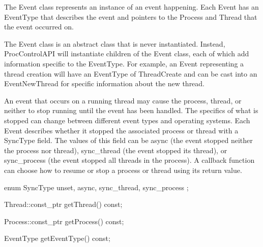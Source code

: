 
The Event class represents an instance of an event happening. Each Event
has an EventType that describes the event and pointers to the Process and
Thread that the event occurred on.

The Event class is an abstract class that is never instantiated. Instead,
ProcControlAPI will instantiate children of the Event class, each of which add
information specific to the EventType. For example, an Event representing a
thread creation will have an EventType of ThreadCreate and can be cast into an
EventNewThread for specific information about the new thread.

An event that occurs on a running thread may cause the process, thread, or
neither to stop running until the event has been handled. The specifics of
what is stopped can change between different event types and operating systems.
Each Event describes whether it stopped the associated process or thread with
a SyncType field. The values of this field can be async (the event stopped
neither the process nor thread), sync\_thread (the event stopped its thread),
or sync\_process (the event stopped all threads in the process). A callback
function can choose how to resume or stop a process or thread using its return
value.

\begin{apient}
  enum SyncType { unset, async, sync_thread, sync_process };
\end{apient}


\begin{apient}
  Thread::const_ptr getThread() const;
\end{apient}


\begin{apient}
  Process::const_ptr getProcess() const;
\end{apient}


\begin{apient}
  EventType getEventType() const;
\end{apient}

